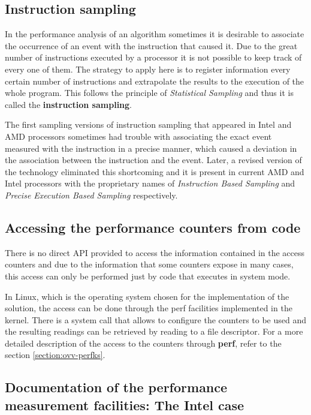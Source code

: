\subsection{Instruction sampling}\label{subsection:sampling}
In the performance analysis of an algorithm sometimes it is desirable to associate the occurrence of an event with the instruction that caused it. Due to the great number of instructions executed by a processor it is not possible to keep track of every one of them. The strategy to apply here is to register information every certain number of instructions and extrapolate the results to the execution of the whole program. This follows the principle of \textit{Statistical Sampling} and thus it is called the \textbf{instruction sampling}.

The first sampling versions of instruction sampling that appeared in Intel and AMD processors sometimes had trouble with associating the exact event measured with the instruction in a precise manner, which caused a deviation in the association between the instruction and the event. Later, a revised version of the technology eliminated this shortcoming and it is present in current AMD and Intel processors with the proprietary names of \textit{Instruction Based Sampling} \cite{amd-ibs} and \textit{Precise Execution Based Sampling}  respectively. 

\subsection{Accessing the performance counters from code}\label{subsection:accessing-code}

There is no direct API provided to access the information contained in the access counters and due to the information that some counters expose in many cases, this access can only be performed just by code that executes in system mode.

In Linux, which is the operating system chosen for the implementation of the solution, the access can be done through the perf facilities implemented in the kernel. There is a system call that allows to configure the counters to be used and the resulting readings can be retrieved by reading to a file descriptor. For a more detailed description of the access to the counters through \textbf{perf}, refer to the section \ref{section:ovv-perfks}. 

\subsection{Documentation of the performance measurement facilities: The Intel case }\label{subsection:performance-documentation}

